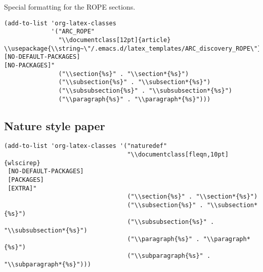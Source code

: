 \documentclass[12pt]{article}
\begin{document}
Special formatting for the ROPE sections.

\begin{verbatim}
(add-to-list 'org-latex-classes
             '("ARC_ROPE"
               "\\documentclass[12pt]{article}
\\usepackage{\\string~\"/.emacs.d/latex_templates/ARC_discovery_ROPE\"}
[NO-DEFAULT-PACKAGES]
[NO-PACKAGES]"
               ("\\section{%s}" . "\\section*{%s}")
               ("\\subsection{%s}" . "\\subsection*{%s}")
               ("\\subsubsection{%s}" . "\\subsubsection*{%s}")
               ("\\paragraph{%s}" . "\\paragraph*{%s}")))
\end{verbatim}



\subsection{Nature style paper}
\label{sec:org23c74ff}

\begin{verbatim}
(add-to-list 'org-latex-classes '("naturedef"
                                  "\\documentclass[fleqn,10pt]{wlscirep}
 [NO-DEFAULT-PACKAGES]
 [PACKAGES]
 [EXTRA]"
                                  ("\\section{%s}" . "\\section*{%s}")
                                  ("\\subsection{%s}" . "\\subsection*{%s}")
                                  ("\\subsubsection{%s}" . "\\subsubsection*{%s}")
                                  ("\\paragraph{%s}" . "\\paragraph*{%s}")
                                  ("\\subparagraph{%s}" . "\\subparagraph*{%s}")))
\end{verbatim}
\end{document}
